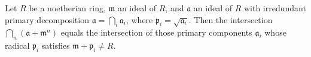 Let $R$ be a noetherian ring, $\mathfrak{m}$ an ideal of $R$, and $\mathfrak{a}$ an ideal of $R$ with irredundant primary decomposition $\mathfrak{a} = \bigcap_i \mathfrak{a}_i$, where $\mathfrak{p}_i = \sqrt{\mathfrak{a}_i}$. Then the intersection $\bigcap_n (\mathfrak{a} + \mathfrak{m}^n)$ equals the intersection of those primary components $\mathfrak{a}_i$ whose radical $\mathfrak{p}_i$ satisfies $\mathfrak{m} + \mathfrak{p}_i \neq R$.
